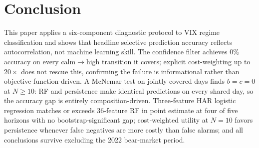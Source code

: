 \documentclass[11pt]{article}
\begin{document}
\section{Conclusion}
\label{sec:conclusion}

This paper applies a six-component diagnostic protocol to VIX regime classification and shows that headline selective prediction accuracy reflects autocorrelation, not machine learning skill. The confidence filter achieves 0\% accuracy on every calm$\to$high transition it covers; explicit cost-weighting up to $20{\times}$ does not rescue this, confirming the failure is informational rather than objective-function-driven. A McNemar test on jointly covered days finds $b = c = 0$ at $N \geq 10$: RF and persistence make identical predictions on every shared day, so the accuracy gap is entirely composition-driven. Three-feature HAR logistic regression matches or exceeds 36-feature RF in point estimate at four of five horizons with no bootstrap-significant gap; cost-weighted utility at $N = 10$ favors persistence whenever false negatives are more costly than false alarms; and all conclusions survive excluding the 2022 bear-market period.
\end{document}
